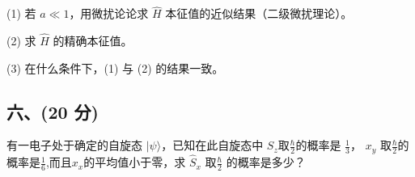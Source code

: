(1) 若 $a \ll 1$，用微扰论论求 $\hat{H}$ 本征值的近似结果（二级微扰理论）。

(2) 求 $\hat{H}$ 的精确本征值。

(3) 在什么条件下，(1) 与 (2) 的结果一致。
\subsection{六、(20 分)}
有一电子处于确定的自旋态 $|\psi \rangle$，已知在此自旋态中 $S_z$取$\frac{\hbar}{2}$的概率是 $\frac{1}{3}$， $x_y$ 取$\frac{\hbar}{2}$的概率是$\frac{1}{6}$,而且$x_x$的平均值小于零，求 $\hat{S}_x$ 取$\frac{\hbar}{2}$ 的概率是多少？



